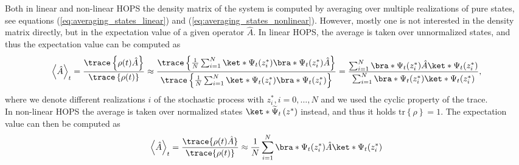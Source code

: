 Both in linear and non-linear HOPS the density matrix of the system is computed by
averaging over multiple realizations of pure states, see equations 
(\ref{eq:averaging_states_linear}) and (\ref{eq:averaging_states_nonlinear}).
However, mostly one is not interested in the density matrix directly, but in 
the expectation value of a given operator $\hat{A}$. In linear HOPS, the average
is taken over unnormalized states, and thus the expectation value can be computed as
\begin{equation}
    \left\langle\hat{A}\right\rangle_t 
    = \frac{\trace\left\{\rho(t)\hat{A}\right\}}{\trace\left\{\rho(t)\right\}}
    \approx \frac{\trace\left\{\frac{1}{N}\sum_{i=1}^{N}\ket*{\Psi_t(z^*_i)}\bra*{\Psi_t(z^*_i)}\hat{A}\right\}}
    {\trace\left\{\frac{1}{N}\sum_{i=1}^{N}\ket*{\Psi_t(z^*_i)}\bra*{\Psi_t(z^*_i)}\right\}}
    = \frac{\sum_{i=1}^{N}\bra*{\Psi_t(z^*_i)}\hat{A}\ket*{\Psi_t(z^*_i)}}
    {\sum_{i=1}^{N}\bra*{\Psi_t(z^*_i)}\ket*{\Psi_t(z^*_i)}},
\end{equation}
where we denote different realizations $i$ of the stochastic process with $z^*_i, i=0,\dots,N$ and we used the
cyclic property of the trace.
\\
In non-linear HOPS the average is taken over normalized states $\ket*{\widetilde{\Psi}_t\left(z^*\right)}$ instead,
and thus it holds $\text{tr}\left\{\rho\right\} = 1$. The expectation value can then be
computed as
\begin{equation}
    \left\langle\hat{A}\right\rangle_t 
    = \frac{\trace{\rho(t)\hat{A}}}{\trace{\rho(t)}}
    \approx \frac{1}{N}\sum_{i=1}^{N} \bra*{\Psi_t(z^*_i)} \hat{A} \ket*{\Psi_t(z^*_i)}
\end{equation}